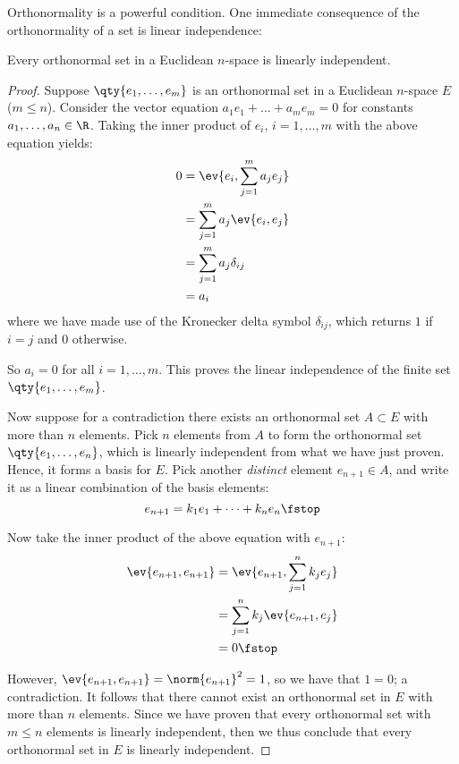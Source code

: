 Orthonormality is a powerful condition. One immediate consequence of the orthonormality of a set is linear independence:
\begin{proposition}
  Every orthonormal set in a Euclidean \( n \)-space is linearly independent.
\end{proposition}
\begin{proof}
  Suppose \( \qty{e_1,\dots,e_m} \) is an orthonormal set in a Euclidean \( n \)-space \( E \) (\( m\leq n \)). Consider the vector equation \( a_1e_1+\dots+a_me_m=0 \) for constants \( a_1,\dots,a_n\in\R \). Taking the inner product of \( e_i \), \( i=1,\dots,m \) with the above equation yields:
  \begin{align*}
    0&= \ev{e_i,\sum_{j=1}^ma_je_j}\\
    &=\sum_{j=1}^ma_j\ev{e_i,e_j}\\
    &= \sum_{j=1}^ma_j\delta_{ij}\\
    &= a_i
  \end{align*}
  where we have made use of the Kronecker delta symbol \( \delta_{ij} \), which returns \( 1 \) if \( i=j \) and 0 otherwise.

  \vspace{3mm}

  
  So \( a_i=0 \) for all \( i=1,\dots, m \). This proves the linear independence of the finite set \( \qty{e_1,\dots,e_m} \).

  \vspace{3mm}

  Now suppose for a contradiction there exists an orthonormal set \( A\subset E \) with more than \( n \) elements. Pick \( n \) elements from \( A \) to form the orthonormal set \( \qty{e_1,\dots,e_n} \), which is linearly independent from what we have just proven. Hence, it forms a basis for \( E \). Pick another \emph{distinct} element \( e_{n+1}\in A \), and write it as a linear combination of the basis elements:
  \[ e_{n+1}=k_1e_1+\dots+k_ne_n\fstop \]
  
  Now take the inner product of the above equation with \( e_{n+1} \):
  \begin{align*}
    \ev{e_{n+1},e_{n+1}}&= \ev{e_{n+1},\sum_{j=1}^nk_je_j}\\
    &= \sum_{j=1}^nk_j\ev{e_{n+1},e_j}\\
    &= 0\fstop
  \end{align*}
  
  However, \( \ev{e_{n+1},e_{n+1}}=\norm{e_{n+1}}^2=1 \), so we have that \( 1=0 \); a contradiction. It follows that there cannot exist an orthonormal set in \( E \) with more than \( n \) elements. Since we have proven that every orthonormal set with \( m\leq n \) elements is linearly independent, then we thus conclude that every orthonormal set in \( E \) is linearly independent.
\end{proof}

